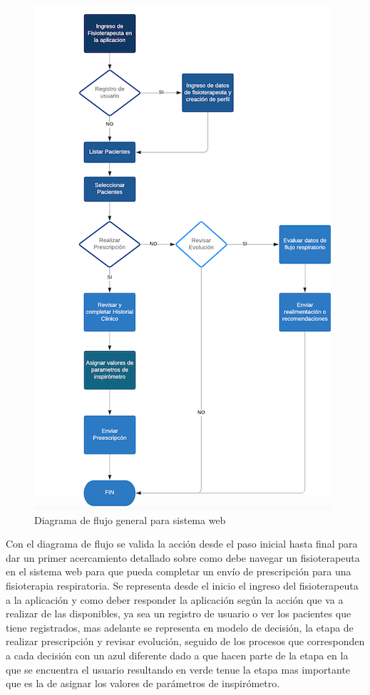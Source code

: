 \documentclass[12pt]{article}
\begin{document}
\begin{figure}[ht]
\centering
\includegraphics[scale=0.622]{imag/DiagramaFlujo.png}
\caption{Diagrama de flujo general para sistema web }
\label{9}
\end{figure}
\FloatBarrier


Con el diagrama de flujo se valida la acción desde el paso inicial hasta final para dar un primer acercamiento detallado sobre como debe navegar un fisioterapeuta en el sistema web para que pueda completar un envío de prescripción para una fisioterapia respiratoria. Se representa desde el inicio el ingreso del fisioterapeuta a la aplicación
y como deber responder la aplicación según la acción que va a realizar de las disponibles, ya sea un registro de usuario o ver los pacientes que tiene registrados, mas adelante se representa en modelo de decisión, la etapa de realizar prescripción y revisar evolución, seguido de los procesos que corresponden a cada decisión con un azul diferente dado a que hacen parte de la etapa en la que se encuentra el usuario resultando en verde tenue la etapa mas importante que es la de asignar los valores de parámetros de inspirómetro. 
\end{document}
